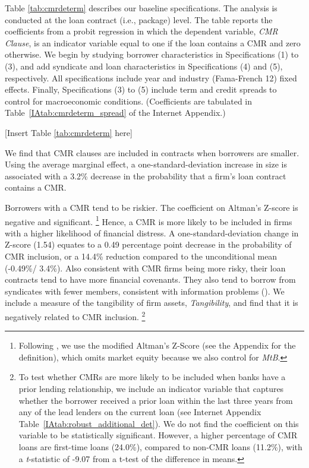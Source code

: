 \documentclass[a4paper,12pt]{article}
\begin{document}
Table \ref{tab:cmrdeterm} describes our baseline specifications. The analysis is conducted at the loan contract (i.e., package) level.
The table reports the coefficients from a probit regression in which the dependent variable, \textit{CMR Clause}, is an indicator variable equal to one if the loan contains a CMR and zero otherwise.
We begin by studying borrower characteristics in Specifications (1) to (3), and add syndicate and loan characteristics in Specifications (4) and (5), respectively.
All specifications include year and industry (Fama-French 12) fixed effects.
Finally, Specifications (3) to (5) include term and credit spreads to control for macroeconomic conditions.
(Coefficients are tabulated in Table~\ref{IAtab:cmrdeterm_spread} of the Internet Appendix.)
%
\begin{center}
	[Insert Table \ref{tab:cmrdeterm} here]
\end{center}

We find that CMR clauses are included in contracts when borrowers are smaller.
Using the average marginal effect, a one-standard-deviation increase in size is associated with a 3.2\% decrease in the probability that a firm's loan contract contains a CMR.


Borrowers with a CMR tend to be riskier.
The coefficient on Altman's Z-score is negative and significant.%
    \footnote{Following \citet{Graham_2008}, we use the modified Altman's Z-Score (see the Appendix for the definition), which omits market equity because we also control for \textit{MtB}.}
Hence, a CMR is more likely to be included in firms with a higher likelihood of financial distress.
A one-standard-deviation change in Z-score (1.54) equates to a 0.49 percentage point decrease in the probability of CMR inclusion, or a 14.4\% reduction compared to the unconditional mean (-0.49\%/ 3.4\%).
Also consistent with CMR firms being more risky, their loan contracts tend to have more financial covenants.
They also tend to borrow from syndicates with fewer members, consistent with information problems (\citet{Ivashina_2009}).
We include a measure of the tangibility of firm assets, \textit{Tangibility}, and find that it is negatively related to CMR inclusion.%
    \footnote{To test whether CMRs are more likely to be included when banks have a prior lending relationship, we include an indicator variable that captures whether the borrower received a prior loan within the last three years from any of the lead lenders on the current loan (see Internet Appendix Table~\ref{IAtab:robust_additional_det}).
    We do not find the coefficient on this variable to be statistically significant.
    However, a higher percentage of CMR loans are first-time loans (24.0\%), compared to non-CMR loans (11.2\%), with a \textit{t}-statistic of -9.07 from a t-test of the difference in means.}
\end{document}

